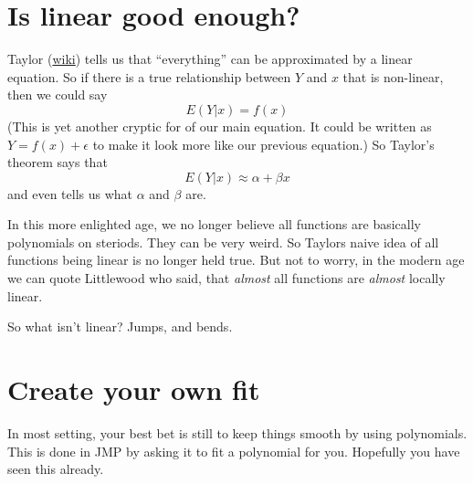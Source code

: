 \documentclass{article}
\begin{document}
\section{Is linear good enough?}

Taylor (\href{http://en.wikipedia.org/wiki/Brook_Taylor}{wiki}) tells
us that ``everything'' can be approximated by a linear equation.  So
if there is a true relationship between $Y$ and $x$ that is
non-linear, then we could say 
\begin{displaymath}
E(Y|x) = f(x)
\end{displaymath}
(This is yet another cryptic for of our main equation.  It could be
written as $Y = f(x) + \epsilon$ to make it look more like our
previous equation.)  So Taylor's theorem says that
\begin{displaymath}
E(Y|x) \approx \alpha + \beta x
\end{displaymath}
and even tells us what $\alpha$ and $\beta$ are.  

In this more enlighted age, we no longer believe all functions are
basically polynomials on steriods.  They can be very weird.  So
Taylors naive idea of all functions being linear is no longer held
true.  But not to worry, in the modern age we can quote Littlewood who
said, that {\it almost} all functions are {\it almost} locally
linear. 

So what isn't linear?  Jumps, and bends.

\section{Create your own fit}

In most setting, your best bet is still to keep things smooth by using
polynomials.  This is done in JMP by asking it to fit a polynomial for
you.  Hopefully you have seen this already.  
\end{document}

